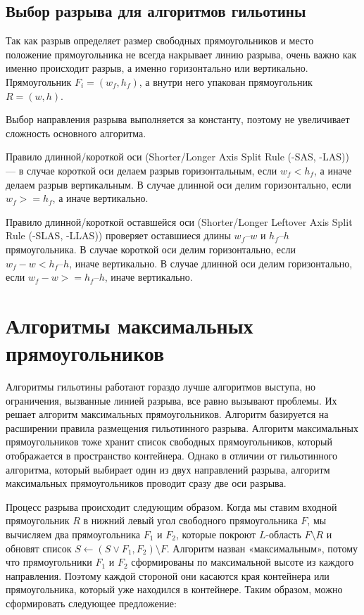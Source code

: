 \documentclass[a4paper,12pt]{report}
\begin{document}
\subsection{Выбор разрыва для алгоритмов гильотины}

Так как разрыв определяет размер свободных прямоугольников и место положение прямоугольника не всегда накрывает линию разрыва, очень важно как именно происходит разрыв, а именно горизонтально или вертикально. Прямоугольник $F_i = (w_f, h_f)$, а внутри него упакован прямоугольник $R = (w, h)$.

Выбор направления разрыва выполняется за константу, поэтому не увеличивает сложность основного алгоритма. 

Правило длинной/короткой оси (Shorter/Longer Axis Split Rule (-SAS, -LAS)) — в случае короткой оси делаем разрыв горизонтальным, если $w_f < h_f$, а иначе делаем разрыв вертикальным. В случае длинной оси делим горизонтально, если $w_f >= h_f$, а иначе вертикально.

Правило длинной/короткой оставшейся оси (Shorter/Longer Leftover Axis Split Rule (-SLAS, -LLAS)) проверяет оставшиеся длины $w_f – w$ и $h_f – h$ прямоугольника. В случае короткой оси делим горизонтально, если $w_f - w < h_f – h$, иначе вертикально. В случае длинной оси делим горизонтально, если  $w_f - w >= h_f – h$, иначе вертикально.


\section{Алгоритмы максимальных прямоугольников}

Алгоритмы гильотины работают гораздо лучше алгоритмов выступа, но ограничения, вызванные линией разрыва, все равно вызывают проблемы. Их решает алгоритм максимальных прямоугольников. Алгоритм базируется на расширении правила размещения гильотинного разрыва. Алгоритм максимальных прямоугольников тоже хранит список свободных прямоугольников, который отображается в пространство контейнера. Однако в отличии от гильотинного алгоритма, который выбирает один из двух направлений разрыва, алгоритм максимальных прямоугольников проводит сразу две оси разрыва.

Процесс разрыва происходит следующим образом. Когда мы ставим входной прямоугольник $R$ в нижний левый угол свободного прямоугольника $F$, мы вычисляем два прямоугольника $F_1$ и $F_2$, которые покроют $L$-область $F\setminus R$ и обновят список $S \leftarrow (S \vee {F_1, F_2}) \setminus {F}$. Алгоритм назван «максимальным», потому что прямоугольники $F_1$ и $F_2$ сформированы по максимальной высоте из каждого направления. Поэтому каждой стороной они касаются края контейнера или прямоугольника, который уже находился в контейнере. Таким образом, можно сформировать следующее предложение:
\end{document}

